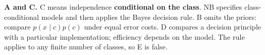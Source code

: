 \textbf{A and C.} C means independence \textbf{conditional on the class}. NB specifies class-conditional models and then applies the Bayes decision rule. B omits the priors: compare \(p(x\mid c)p(c)\) under equal error costs. D compares a decision principle with a particular implementation; efficiency depends on the model. The rule applies to any finite number of classes, so E is false.

